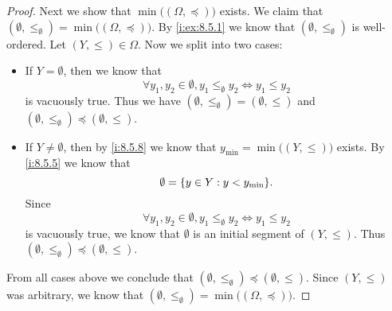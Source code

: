 \begin{proof}
  Next we show that \(\min\big((\Omega, \preceq)\big)\) exists.
  We claim that \((\emptyset, \leq_{\emptyset}) = \min\big((\Omega, \preceq)\big)\).
  By \cref{i:ex:8.5.1} we know that \((\emptyset, \leq_{\emptyset})\) is well-ordered.
  Let \((Y, \leq) \in \Omega\).
  Now we split into two cases:
  \begin{itemize}
    \item If \(Y = \emptyset\), then we know that
          \[
            \forall y_1, y_2 \in \emptyset, y_1 \leq_{\emptyset} y_2 \iff y_1 \leq y_2
          \]
          is vacuously true.
          Thus we have \((\emptyset, \leq_{\emptyset}) = (\emptyset, \leq)\) and \((\emptyset, \leq_{\emptyset}) \preceq (\emptyset, \leq)\).
    \item If \(Y \neq \emptyset\), then by \cref{i:8.5.8} we know that \(y_{\min} = \min\big((Y, \leq)\big)\) exists.
          By \cref{i:8.5.5} we know that
          \[
            \emptyset = \set{y \in Y : y < y_{\min}}.
          \]
          Since
          \[
            \forall y_1, y_2 \in \emptyset, y_1 \leq_{\emptyset} y_2 \iff y_1 \leq y_2
          \]
          is vacuously true, we know that \(\emptyset\) is an initial segment of \((Y, \leq)\).
          Thus \((\emptyset, \leq_{\emptyset}) \preceq (\emptyset, \leq)\).
  \end{itemize}
  From all cases above we conclude that \((\emptyset, \leq_{\emptyset}) \preceq (\emptyset, \leq)\).
  Since \((Y, \leq)\) was arbitrary, we know that \((\emptyset, \leq_{\emptyset}) = \min\big((\Omega, \preceq)\big)\).


\end{proof}
